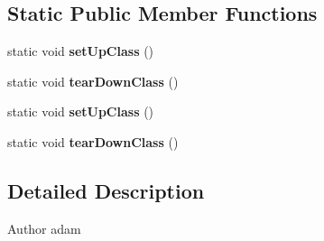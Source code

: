 \subsection*{Static Public Member Functions}
\begin{DoxyCompactItemize}
\item 
\hypertarget{class_c_a_s_u_a_l_1_1caspac_1_1_caspac_test_aff28bc082be38caa5812996b18d6ac1a}{static void {\bfseries set\-Up\-Class} ()}\label{class_c_a_s_u_a_l_1_1caspac_1_1_caspac_test_aff28bc082be38caa5812996b18d6ac1a}

\item 
\hypertarget{class_c_a_s_u_a_l_1_1caspac_1_1_caspac_test_aabfd9607ccc8a2080a2d7be793bdf0f5}{static void {\bfseries tear\-Down\-Class} ()}\label{class_c_a_s_u_a_l_1_1caspac_1_1_caspac_test_aabfd9607ccc8a2080a2d7be793bdf0f5}

\item 
\hypertarget{class_c_a_s_u_a_l_1_1caspac_1_1_caspac_test_aff28bc082be38caa5812996b18d6ac1a}{static void {\bfseries set\-Up\-Class} ()}\label{class_c_a_s_u_a_l_1_1caspac_1_1_caspac_test_aff28bc082be38caa5812996b18d6ac1a}

\item 
\hypertarget{class_c_a_s_u_a_l_1_1caspac_1_1_caspac_test_aabfd9607ccc8a2080a2d7be793bdf0f5}{static void {\bfseries tear\-Down\-Class} ()}\label{class_c_a_s_u_a_l_1_1caspac_1_1_caspac_test_aabfd9607ccc8a2080a2d7be793bdf0f5}

\end{DoxyCompactItemize}


\subsection{Detailed Description}
\begin{DoxyAuthor}{Author}
adam 
\end{DoxyAuthor}


